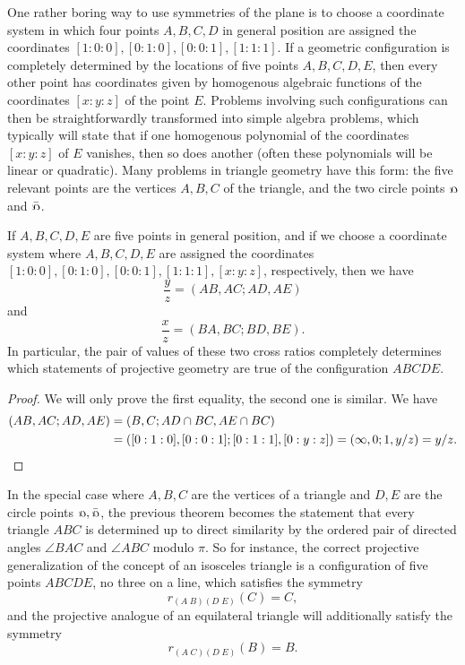 
One rather boring way to use symmetries of the plane is to choose a coordinate system in which four points $A,B,C,D$ in general position are assigned the coordinates $[1:0:0], [0:1:0], [0:0:1], [1:1:1]$. If a geometric configuration is completely determined by the locations of five points $A,B,C,D,E$, then every other point has coordinates given by homogenous algebraic functions of the coordinates $[x:y:z]$ of the point $E$. Problems involving such configurations can then be straightforwardly transformed into simple algebra problems, which typically will state that if one homogenous polynomial of the coordinates $[x:y:z]$ of $E$ vanishes, then so does another (often these polynomials will be linear or quadratic). Many problems in triangle geometry have this form: the five relevant points are the vertices $A,B,C$ of the triangle, and the two circle points $\fish$ and $\bar\fish$.

\begin{thm} If $A,B,C,D,E$ are five points in general position, and if we choose a coordinate system where $A,B,C,D,E$ are assigned the coordinates $[1:0:0], [0:1:0], [0:0:1], [1:1:1], [x:y:z]$, respectively, then we have
\[
\frac{y}{z} = (AB,AC;AD,AE)
\]
and
\[
\frac{x}{z} = (BA,BC;BD,BE).
\]
In particular, the pair of values of these two cross ratios completely determines which statements of projective geometry are true of the configuration $ABCDE$.
\end{thm}
\begin{proof} We will only prove the first equality, the second one is similar. We have
\begin{align*}
(AB,AC;AD,AE) &= (B,C;AD\cap BC, AE\cap BC)\\
&= ([0:1:0],[0:0:1];[0:1:1],[0:y:z]) = (\infty,0;1,y/z) = y/z.\qedhere
\end{align*}
\end{proof}

In the special case where $A,B,C$ are the vertices of a triangle and $D,E$ are the circle points $\fish,\bar\fish$, the previous theorem becomes the statement that every triangle $ABC$ is determined up to direct similarity by the ordered pair of directed angles $\angle BAC$ and $\angle ABC$ modulo $\pi$. So for instance, the correct projective generalization of the concept of an isosceles triangle is a configuration of five points $ABCDE$, no three on a line, which satisfies the symmetry
\[
r_{(A\;B)(D\;E)}(C) = C,
\]
and the projective analogue of an equilateral triangle will additionally satisfy the symmetry
\[
r_{(A\;C)(D\;E)}(B) = B.
\]

